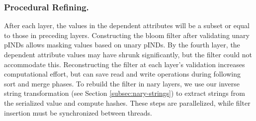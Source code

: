 \subsubsection{Procedural Refining.} After each layer, the values in the dependent attributes will be a subset or equal to those in preceding layers. Constructing the bloom filter after validating unary pINDs allows masking values based on unary pINDs. By the fourth layer, the dependent attribute values may have shrunk significantly, but the filter could not accommodate this. Reconstructing the filter at each layer's validation increases computational effort, but can save read and write operations during following sort and merge phases. To rebuild the filter in nary layers, we use our inverse string transformation (see Section \ref{subsec:nary-strings}) to extract strings from the serialized value and compute hashes. These steps are parallelized, while filter insertion must be synchronized between threads.
